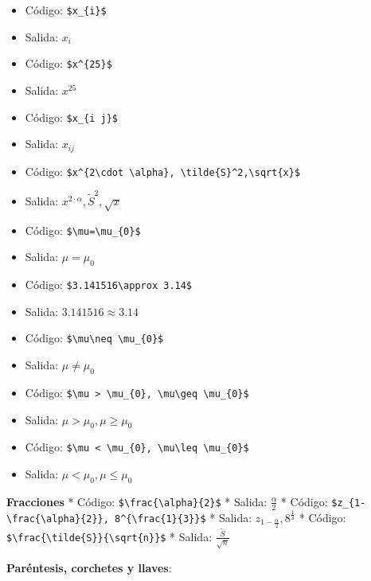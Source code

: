 \documentclass[]{article}
\begin{document}
\begin{itemize}
\itemsep1pt\parskip0pt
\item
  Código: \texttt{\$x\_\{i\}\$}
\item
  Salida: $x_{i}$
\item
  Código: \texttt{\$x\^{}\{25\}\$}
\item
  Salida: $x^{25}$
\item
  Código: \texttt{\$x\_\{i j\}\$}
\item
  Salida: $x_{i j}$
\item
  Código:
  \texttt{\$x\^{}\{2\textbackslash{}cdot \textbackslash{}alpha\}, \textbackslash{}tilde\{S\}\^{}2,\textbackslash{}sqrt\{x\}\$}
\item
  Salida: $x^{2\cdot \alpha}, \tilde{S}^2, \sqrt{x}$
\item
  Código: \texttt{\$\textbackslash{}mu=\textbackslash{}mu\_\{0\}\$}
\item
  Salida: $\mu=\mu_{0}$
\item
  Código: \texttt{\$3.141516\textbackslash{}approx 3.14\$}
\item
  Salida: $3.141516\approx 3.14$
\item
  Código:
  \texttt{\$\textbackslash{}mu\textbackslash{}neq \textbackslash{}mu\_\{0\}\$}
\item
  Salida: $\mu\neq \mu_{0}$
\item
  Código:
  \texttt{\$\textbackslash{}mu \textgreater{} \textbackslash{}mu\_\{0\}, \textbackslash{}mu\textbackslash{}geq \textbackslash{}mu\_\{0\}\$}
\item
  Salida: $\mu > \mu_{0}, \mu\geq \mu_{0}$
\item
  Código:
  \texttt{\$\textbackslash{}mu \textless{} \textbackslash{}mu\_\{0\}, \textbackslash{}mu\textbackslash{}leq \textbackslash{}mu\_\{0\}\$}
\item
  Salida: $\mu < \mu_{0}, \mu\leq \mu_{0}$
\end{itemize}

\textbf{Fracciones} * Código:
\texttt{\$\textbackslash{}frac\{\textbackslash{}alpha\}\{2\}\$} *
Salida: $\frac{\alpha}{2}$ * Código:
\texttt{\$z\_\{1-\textbackslash{}frac\{\textbackslash{}alpha\}\{2\}\}, 8\^{}\{\textbackslash{}frac\{1\}\{3\}\}\$}
* Salida: $z_{1-\frac{\alpha}{2}}, 8^{\frac{1}{3}}$ * Código:
\texttt{\$\textbackslash{}frac\{\textbackslash{}tilde\{S\}\}\{\textbackslash{}sqrt\{n\}\}\$}
* Salida: $\frac{\tilde{S}}{\sqrt{n}}$

\textbf{Paréntesis, corchetes y llaves}:
\end{document}
